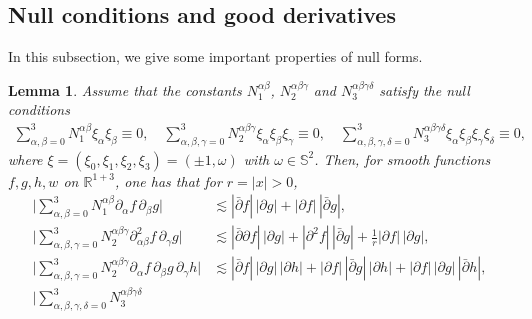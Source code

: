\documentclass[11pt,twoside]{article}
\theoremstyle{plain}
\newtheorem{lemma}[theorem]{Lemma}
\theoremstyle{definition}
\theoremstyle{assumption}
\numberwithin{equation}{section}
\begin{document}
	
	
	\subsection{Null conditions and good derivatives}\label{subsec:Good-derivative}
	
	In this subsection, we give some important properties of null forms.
	
	
		
	\begin{lemma}\label{lem:null}
		Assume that the constants $N_1^{\alpha\beta}$, $N_2^{\alpha\beta\gamma}$ and
		$N_3^{\alpha\beta\gamma\delta}$ satisfy the null conditions
		\begin{equation}\label{eq:null-condition-tensors}
			\begin{aligned}
				\sum_{\alpha,\beta=0}^3
				N_1^{\alpha\beta}\xi_\alpha\xi_\beta\equiv 0,
				\quad
				\sum_{\alpha,\beta,\gamma=0}^3
				N_2^{\alpha\beta\gamma}\xi_\alpha\xi_\beta\xi_\gamma\equiv0,
				\quad
				\sum_{\alpha,\beta,\gamma,\delta=0}^3
				N_3^{\alpha\beta\gamma\delta}\xi_\alpha\xi_\beta\xi_\gamma\xi_\delta\equiv0,
			\end{aligned}
		\end{equation}
		where $\xi=(\xi_0,\xi_1,\xi_2,\xi_3)=(\pm1,\omega)$ with $\omega\in\mathbb S^2$.
		Then, for smooth functions $f,g,h,w$ on $\mathbb R^{1+3}$, one has that for
		$r=|x|>0$,
		\begin{equation}\label{eq:null-structure-estimates}
			\begin{aligned}
				\big|
				\sum_{\alpha,\beta=0}^3
				N_1^{\alpha\beta}\partial_{\alpha}f\,\partial_{\beta}g
				\big|
				&\lesssim
				|\bar\partial f|\,|\partial g|
				+
				|\partial f|\,|\bar\partial g|,
				\\
				\big|
				\sum_{\alpha,\beta,\gamma=0}^3
				N_2^{\alpha\beta\gamma}\partial^2_{\alpha\beta}f\,\partial_{\gamma}g
				\big|
				&\lesssim
				|\bar\partial\partial f|\,|\partial g|
				+
				|\partial^2 f|\,|\bar\partial g|
				+
				\frac1r|\partial f|\,|\partial g|,
				\\
				\big|
				\sum_{\alpha,\beta,\gamma=0}^3
				N_2^{\alpha\beta\gamma}
				\partial_{\alpha}f\,\partial_{\beta}g\,\partial_{\gamma}h
				\big|
				&\lesssim
				|\bar\partial f|\,|\partial g|\,|\partial h|
				+
				|\partial f|\,|\bar\partial g|\,|\partial h|
				+
				|\partial f|\,|\partial g|\,|\bar\partial h|,
				\\
				\big|
				\sum_{\alpha,\beta,\gamma,\delta=0}^3
				N_3^{\alpha\beta\gamma\delta}

\end{aligned}
\end{equation}
\end{lemma}
\end{document}
